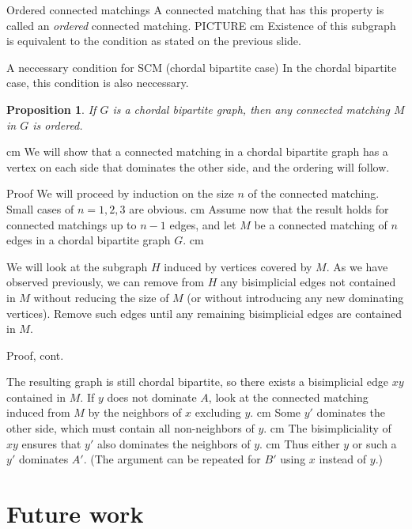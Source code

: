 \documentclass{beamer}
\newtheorem{prop}{Proposition}
\newcommand{\bframe}[2]{\begin{frame}{#1}#2\end{frame}}
\begin{document}
\bframe{Ordered connected matchings}{
A connected matching that has this property is called an {\it ordered } connected matching. PICTURE\pause\vskip 0.5 cm
Existence of this subgraph is equivalent to the condition as stated on the previous slide.
}

\bframe{A neccessary condition for SCM (chordal bipartite case)}{
In the chordal bipartite case, this condition is also neccessary.
\begin{prop}
	If $G$ is a chordal bipartite graph, then any connected matching $M$ in $G$ is ordered.
\end{prop}\pause\vskip 0.5 cm  
	We will show that a connected matching in a chordal bipartite graph has a vertex on each side that dominates the other side, and the ordering will follow.
}
\bframe{Proof}
{
 	We will proceed by induction on the size $n$ of the connected matching. \pause Small cases of $n = 1,2,3$ are obvious.  \pause \vskip 0.5 cm
	Assume now that the result holds for connected matchings up to $n-1$ edges, and let $M$ be a connected matching of $n$ edges in a chordal bipartite graph $G$.\pause \vskip 0.5 cm 

We will look at the subgraph $H$  induced by vertices covered by $M$.  \pause As we have observed previously, we can remove from $H$ any bisimplicial edges not contained in $M$ without reducing the size of $M$ \pause(or without introducing any new dominating vertices).  \pause  Remove such edges until any remaining bisimplicial edges are contained in $M$.
}

\bframe{Proof, cont.}{

The resulting graph is still chordal bipartite, so there exists a bisimplicial edge $xy$ contained in $M$. \pause If $y$ does not dominate $A$, look at the connected matching induced from $M$ by the neighbors of $x$ excluding $y$.  \pause \vskip 0.5 cm
Some $y'$ dominates the other side, which must contain all non-neighbors of $y$. \pause \vskip 0.5 cm The bisimpliciality of $xy$ ensures that $y'$ also dominates the neighbors of $y$.  \pause \vskip 0.5 cm Thus either $y$ or such a $y'$ dominates $A'$.  \pause (The argument can be repeated for $B'$ using $x$ instead of $y$.)  

}

\section{Future work}
\end{document}
